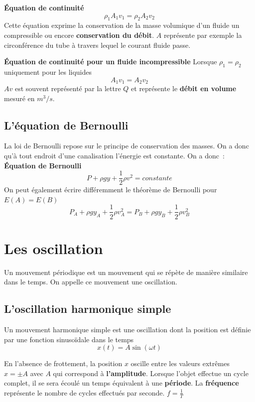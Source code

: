 \documentclass{article}
\begin{document}
\noindent
\textbf{Équation de continuité}
\[\rho_1A_1v_1 = \rho_2A_2v_2\]
Cette équation exprime la conservation de la masse volumique d'un fluide un compressible ou encore \textbf{conservation du débit}. $A$ représente par exemple la circonférence du tube à travers lequel le courant fluide passe.
\newline

\noindent
\textbf{Équation de continuité pour un fluide incompressible}
Lorsque $\rho_1 = \rho_2$ uniquement pour les liquides
\[A_1v_1 = A_2v_2\]
$Av$ est souvent représenté par la lettre $Q$ et représente le \textbf{débit en volume} mesuré en $m^3/s$.

\subsection{L'équation de Bernoulli}

La loi de Bernoulli repose sur le principe de conservation des masses. On a donc qu'à tout endroit d'une canalisation l'énergie est constante. On a donc :
\newline
\textbf{Équation de Bernoulli}
\[P + \rho gy + \frac{1}{2}\rho v^2 = constante\]
On peut également écrire différemment le théorème de Bernoulli pour $E(A) = E(B)$
\[P_A + \rho gy_A + \frac{1}{2}\rho v_A^2 = P_B + \rho gy_B + \frac{1}{2}\rho v_B^2\]

\section{Les oscillation}
Un mouvement périodique est un mouvement qui se répète de manière similaire dans le temps. On appelle ce mouvement une oscillation.

\subsection{L'oscillation harmonique simple}
Un mouvement harmonique simple est une oscillation dont la position est définie par une fonction sinusoïdale dans le temps
\newline
$$x(t) = A \sin(\omega t)$$

\newline
En l'absence de frottement, la position $x$ oscille entre les valeurs extrêmes $x = \pm A$ avec $A$ qui correspond à \textbf{l'amplitude}.
\newline
Lorsque l'objet effectue un cycle complet, il se sera écoulé un temps équivalent à une \textbf{période}.
\newline
La \textbf{fréquence} représente le nombre de cycles effectués par seconde. $f = \frac{1}{T}$
\newline
\end{document}
